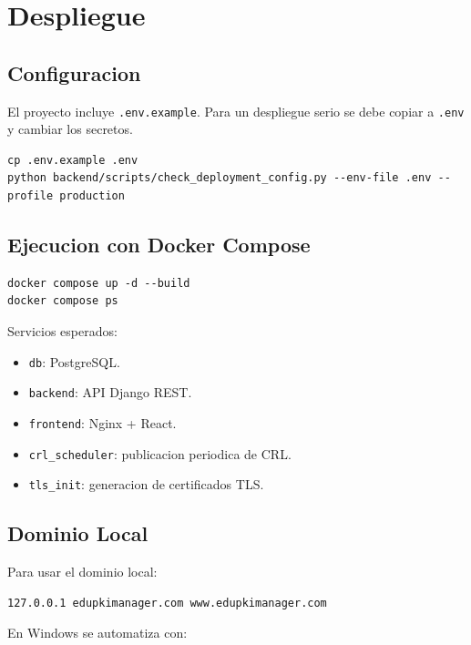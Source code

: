 \documentclass[12pt,a4paper]{article}
\begin{document}
\section{Despliegue}

\subsection{Configuracion}

El proyecto incluye \texttt{.env.example}. Para un despliegue serio se debe copiar a \texttt{.env} y cambiar los secretos.

\begin{lstlisting}[style=code]
cp .env.example .env
python backend/scripts/check_deployment_config.py --env-file .env --profile production
\end{lstlisting}

\subsection{Ejecucion con Docker Compose}

\begin{lstlisting}[style=code]
docker compose up -d --build
docker compose ps
\end{lstlisting}

Servicios esperados:

\begin{itemize}[leftmargin=*]
    \item \texttt{db}: PostgreSQL.
    \item \texttt{backend}: API Django REST.
    \item \texttt{frontend}: Nginx + React.
    \item \texttt{crl\_scheduler}: publicacion periodica de CRL.
    \item \texttt{tls\_init}: generacion de certificados TLS.
\end{itemize}

\subsection{Dominio Local}

Para usar el dominio local:

\begin{lstlisting}[style=code]
127.0.0.1 edupkimanager.com www.edupkimanager.com
\end{lstlisting}

En Windows se automatiza con:
\end{document}
